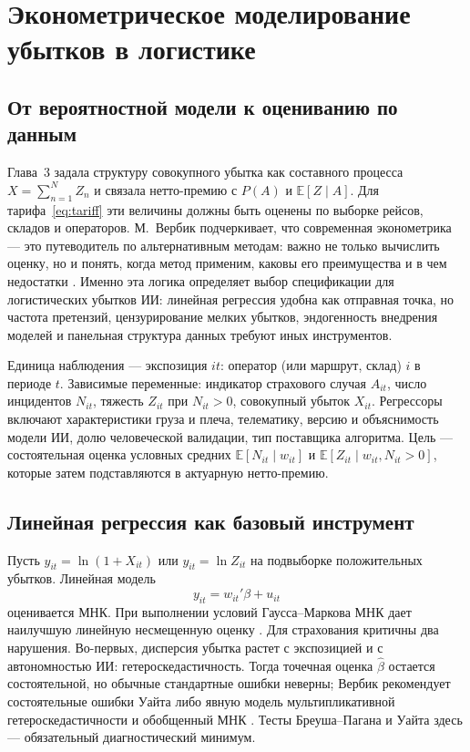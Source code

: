 \documentclass[a4paper,14pt]{extarticle}
\begin{document}
\section{Эконометрическое моделирование убытков в логистике}

\subsection{От вероятностной модели к оцениванию по данным}

Глава~3 задала структуру совокупного убытка как составного процесса $X=\sum_{n=1}^{N}Z_n$ и связала нетто-премию с $P(A)$ и $\mathbb{E}[Z\mid A]$. Для тарифа~\eqref{eq:tariff} эти величины должны быть оценены по выборке рейсов, складов и операторов. М.~Вербик подчеркивает, что современная эконометрика --- это путеводитель по альтернативным методам: важно не только вычислить оценку, но и понять, когда метод применим, каковы его преимущества и в чем недостатки \cite{verbeek}. Именно эта логика определяет выбор спецификации для логистических убытков ИИ: линейная регрессия удобна как отправная точка, но частота претензий, цензурирование мелких убытков, эндогенность внедрения моделей и панельная структура данных требуют иных инструментов.

Единица наблюдения --- экспозиция $it$: оператор (или маршрут, склад) $i$ в периоде $t$. Зависимые переменные: индикатор страхового случая $A_{it}$, число инцидентов $N_{it}$, тяжесть $Z_{it}$ при $N_{it}>0$, совокупный убыток $X_{it}$. Регрессоры включают характеристики груза и плеча, телематику, версию и объяснимость модели ИИ, долю человеческой валидации, тип поставщика алгоритма. Цель --- состоятельная оценка условных средних $\mathbb{E}[N_{it}\mid w_{it}]$ и $\mathbb{E}[Z_{it}\mid w_{it}, N_{it}>0]$, которые затем подставляются в актуарную нетто-премию.

\subsection{Линейная регрессия как базовый инструмент}

Пусть $y_{it}=\ln(1+X_{it})$ или $y_{it}=\ln Z_{it}$ на подвыборке положительных убытков. Линейная модель
\begin{equation}
y_{it}=w_{it}'\beta+u_{it}
\label{eq:ols}
\end{equation}
оценивается МНК. При выполнении условий Гаусса--Маркова МНК дает наилучшую линейную несмещенную оценку \cite{verbeek}. Для страхования критичны два нарушения. Во-первых, дисперсия убытка растет с экспозицией и с автономностью ИИ: гетероскедастичность. Тогда точечная оценка $\hat\beta$ остается состоятельной, но обычные стандартные ошибки неверны; Вербик рекомендует состоятельные ошибки Уайта либо явную модель мультипликативной гетероскедастичности и обобщенный МНК \cite{verbeek}. Тесты Бреуша--Пагана и Уайта здесь --- обязательный диагностический минимум.
\end{document}
